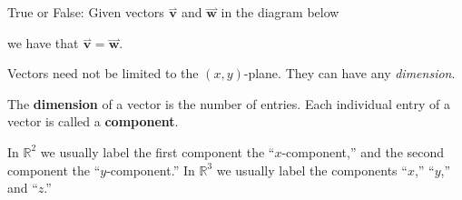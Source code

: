 \documentclass{ximera}
\begin{document}
\begin{question}
  True or False: Given vectors $\overset{\rightharpoonup}{\mathbf{v}}$ and $\overset{\rightharpoonup}{\mathbf{w}}$ in the diagram
  below
  \begin{image}
\end{image}
  we have that $\overset{\rightharpoonup}{\mathbf{v}}=\overset{\rightharpoonup}{\mathbf{w}}$.
  \begin{prompt}
  \begin{multipleChoice}
  \end{multipleChoice}
  \end{prompt}
\end{question}

Vectors need not be limited to the $(x,y)$-plane. They can have any \textit{dimension}.

\begin{definition}
The \textbf{dimension} of a vector is the number of entries. Each
individual entry of a vector is called a \textbf{component}.
\end{definition}

In $\mathbb{R}^2$ we usually label the first component the ``$x$-component,''
and the second component the ``$y$-component.'' In $\mathbb{R}^3$ we usually
label the components ``$x$,'' ``$y$,'' and ``$z$.''
\end{document}
